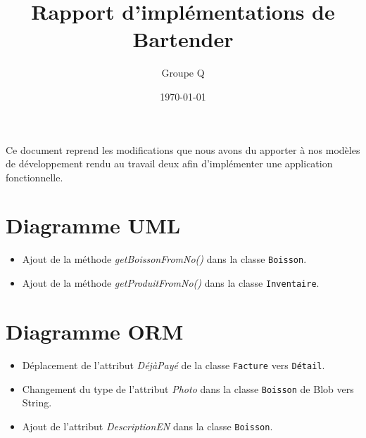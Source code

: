 \documentclass[a4paper,11pt]{article}
\title{Rapport d'implémentations de Bartender}
\date{\today}
\author{Groupe Q}
\begin{document}
{\let\newpage\relax\maketitle}

Ce document reprend les modifications que nous avons du apporter à nos modèles de développement rendu au travail deux afin d'implémenter une application fonctionnelle.

\section{Diagramme UML}

\begin{itemize}
	\item Ajout de la méthode \textit{getBoissonFromNo()} dans la classe \texttt{Boisson}.
	\item Ajout de la méthode \textit{getProduitFromNo()} dans la classe \texttt{Inventaire}.
\end{itemize}

\section{Diagramme ORM}

\begin{itemize}
	\item Déplacement de l'attribut \textit{DéjàPayé} de la classe \texttt{Facture} vers \texttt{Détail}.
	\item Changement du type de l'attribut \textit{Photo} dans la classe \texttt{Boisson} de Blob vers String.
	\item Ajout de l'attribut \textit{DescriptionEN} dans la classe \texttt{Boisson}.
\end{itemize}
\end{document}
